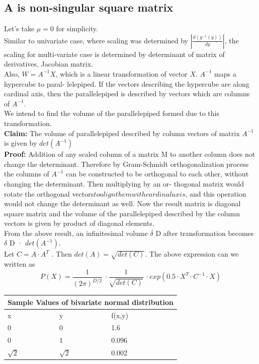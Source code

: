 \documentclass{article}
\begin{document}
\subsection{A is non-singular square matrix}
Let’s take $\mu = 0$ for simplicity.\\
Similar to univariate case, where scaling was determined by $\left|\frac{d(g^{-1}(y))}{dy}\right|$, the scaling for multi-variate
case is determined by determinant of matrix of derivatives, Jacobian matrix.\\
Also, $W = A^{-1}X$, which is a linear transformation of vector $X$. $A^{-1}$ maps a hypercube to paral-
lelepiped. If the vectors describing the hypercube are along cardinal axis, then the parallelepiped
is described by vectors which are columns of $A^{-1}$.\\
We intend to find the volume of the parallelepiped formed due to this transformation.\\
\textbf{Claim: } The volume of parallelepiped described by column vectors of matrix $A^{-1}$ is given by
$det(A^{-1})$\\
\textbf{Proof: } Addition of any scaled column of a matrix M to another column does not change the
determinant.
Therefore by Gram-Schmidt orthogonalization process the columns of $A^{-1}$ can be constructed
to be orthogonal to each other, without changing the determinant. Then multiplying by an or-
thogonal matrix would rotate the orthogonal vectors\(to align them with cardinal axis\), and this
operation would not change the determinant as well. Now the result matrix is diagonal square
matrix and the volume of the parallelepiped described by the column vectors is given by product
of diagonal elements.\\
\newline
From the above result, an infinitesimal volume $\delta$ D after transformation becomes $\delta$ D · $det(A^{-1} )$.\\
\newline
Let $C = A\cdot A^{T}$ . Then $det(A) = \sqrt{det(C)}$. The above expression can we written as\\
\begin{equation}
    P(X) = \frac{1}{(2\pi)^{D/2}}\ \cdot \frac{1}{\sqrt{det(C)}}\ \cdot exp(0.5 \cdot X^{T} \cdot C^{-1} \cdot X)
\end{equation}
%
\begin{tabular}
    {|p{3cm}|p{3cm}||p{3cm}|}
    \hline
    \multicolumn{3}{|c|}{Sample Values of bivariate normal distribution}\\
    \hline
    x &y &f(x,y) \\
    \hline
    0 &0 &1.6 \\
    \hline
    0 &1 &0.096 \\
    \hline
    $\sqrt{2}$ &$\sqrt{2}$ &0.002 \\
    \hline
\end{tabular}


\end{document}
